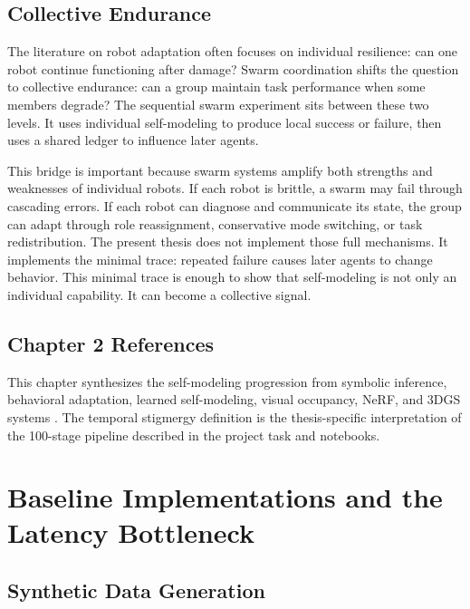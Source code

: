\documentclass[12pt,a4paper,oneside]{report}
\begin{document}
\section{Collective Endurance}

The literature on robot adaptation often focuses on individual resilience: can one robot continue functioning after damage? Swarm coordination shifts the question to collective endurance: can a group maintain task performance when some members degrade? The sequential swarm experiment sits between these two levels. It uses individual self-modeling to produce local success or failure, then uses a shared ledger to influence later agents.

This bridge is important because swarm systems amplify both strengths and weaknesses of individual robots. If each robot is brittle, a swarm may fail through cascading errors. If each robot can diagnose and communicate its state, the group can adapt through role reassignment, conservative mode switching, or task redistribution. The present thesis does not implement those full mechanisms. It implements the minimal trace: repeated failure causes later agents to change behavior. This minimal trace is enough to show that self-modeling is not only an individual capability. It can become a collective signal.

\section*{Chapter 2 References}

This chapter synthesizes the self-modeling progression from symbolic inference, behavioral adaptation, learned self-modeling, visual occupancy, NeRF, and 3DGS systems \cite{bongard2006resilient,cully2015robots,mouret2015illuminating,kwiatkowski2019task,chen2022full,hu2024teaching,mildenhall2020nerf,kerbl20233d,hu2025learning}. The temporal stigmergy definition is the thesis-specific interpretation of the 100-stage pipeline described in the project task and notebooks.

\chapter{Baseline Implementations and the Latency Bottleneck}

\section{Synthetic Data Generation}
\end{document}
